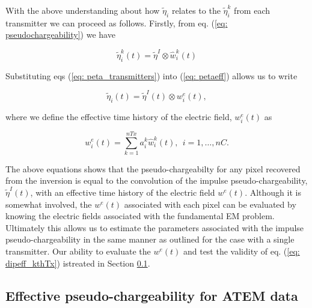 \documentclass[extra,mreferee]{gji}
\newcommand{\peta}{\tilde{\eta}}
\begin{document}
With the above understanding about how $\peta_i$ relates to the $\peta_i^k$ from each transmitter we can proceed  as follows. Firstly, from eq. (\ref{eq: pseudochargeability}) we have
\begin{linenomath*}
\begin{equation}
  \peta_i^k(t) =\peta^I \otimes \hat{w}^{k}_i(t)
  \label{eq: peta_transmitters}
\end{equation}
\end{linenomath*}
Substituting eqs (\ref{eq: peta_transmitters}) into (\ref{eq: petaeff}) allows us to write
\begin{linenomath*}
\begin{equation}
  \peta_i(t) = \peta^I(t) \otimes w^e_i(t),
  \label{eq: peta_eff}
\end{equation}
\end{linenomath*}
where we define the effective time history of the electric field, $w^e_i(t)$ as
\begin{linenomath*}
\begin{equation}
  w^e_i(t)= \sum_{k=1}^{nTx} a^k_i \hat{w}^{k}_i(t), \ \ i=1, \ldots, nC.
  \label{eq: we_eff}
\end{equation}
\end{linenomath*}

The above equations shows that the pseudo-chargeabilty for any pixel recovered from the inversion is equal to the convolution of the impulse pseudo-chargeability, $\peta^I(t)$, with an effective time history of the electric field $w^e(t)$. Although it is somewhat involved, the $w^e(t)$ associated with each pixel can be evaluated by knowing the electric fields associated with the fundamental EM problem. Ultimately this allows us to estimate the parameters associated with the impulse pseudo-chargeability in the same manner as outlined for the case with a single transmitter. Our ability to evaluate the $w^e(t)$ and test the validity of eq. (\ref{eq: dipeff_kthTx}) istreated in Section \ref{subsection: Effective pseudo-chargeability for ATEM data}.


\subsection{Effective pseudo-chargeability for ATEM data}
\label{subsection: Effective pseudo-chargeability for ATEM data}
\end{document}
